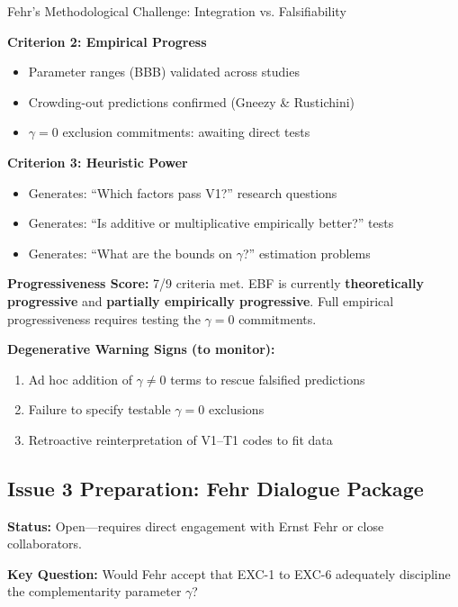 \begin{chapter}{Fehr's Methodological Challenge: Integration vs. Falsifiability}
\begin{tcolorbox}[colback=green!5!white,colframe=green!75!black,title=\textbf{EBF Lakatos Assessment}]
\textbf{Criterion 2: Empirical Progress}
\begin{itemize}[noitemsep]
    \item[$\checkmark$] Parameter ranges (BBB) validated across studies
    \item[$\checkmark$] Crowding-out predictions confirmed (Gneezy \& Rustichini)
    \item[$?$] $\gamma = 0$ exclusion commitments: awaiting direct tests
\end{itemize}

\textbf{Criterion 3: Heuristic Power}
\begin{itemize}[noitemsep]
    \item[$\checkmark$] Generates: ``Which factors pass V1?'' research questions
    \item[$\checkmark$] Generates: ``Is additive or multiplicative empirically better?'' tests
    \item[$\checkmark$] Generates: ``What are the bounds on $\gamma$?'' estimation problems
\end{itemize}
\end{tcolorbox}

\textbf{Progressiveness Score:} 7/9 criteria met. EBF is currently \textbf{theoretically progressive} and \textbf{partially empirically progressive}. Full empirical progressiveness requires testing the $\gamma = 0$ commitments.

\textbf{Degenerative Warning Signs (to monitor):}
\begin{enumerate}[noitemsep]
    \item Ad hoc addition of $\gamma \neq 0$ terms to rescue falsified predictions
    \item Failure to specify testable $\gamma = 0$ exclusions
    \item Retroactive reinterpretation of V1--T1 codes to fit data
\end{enumerate}

\subsection{Issue 3 Preparation: Fehr Dialogue Package}
\label{sec:fehr-dialogue}

\textbf{Status:} Open---requires direct engagement with Ernst Fehr or close collaborators.

\textbf{Key Question:} Would Fehr accept that EXC-1 to EXC-6 adequately discipline the complementarity parameter $\gamma$?


\end{chapter}
